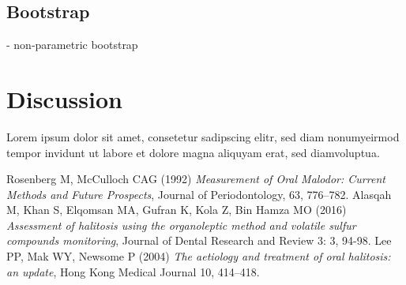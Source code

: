 \documentclass[12pt,a4paper,notitlepage]{report}
\begin{document}
\section{Bootstrap}
- non-parametric bootstrap 



\chapter{Discussion}
Lorem ipsum dolor sit amet, consetetur sadipscing elitr, sed diam nonumyeirmod tempor invidunt ut labore et dolore magna aliquyam erat, sed diamvoluptua. 



\begin{thebibliography}{9}

 Rosenberg M, McCulloch CAG (1992) \emph{Measurement of Oral Malodor: Current Methods and Future Prospects}, Journal of Periodontology, 63, 776–782.
 Alasqah M, Khan S, Elqomsan MA, Gufran K, Kola Z, Bin Hamza MO (2016) \emph{Assessment of halitosis using the organoleptic method and volatile sulfur compounds monitoring}, Journal of Dental Research and Review 3: 3, 94-98.
 Lee PP, Mak WY, Newsome P (2004) \emph{The aetiology and treatment of oral halitosis: an update}, Hong Kong Medical Journal  10, 414–418.


\bibitem[4]{ }   \emph{ }
\end{thebibliography}
\end{document}
